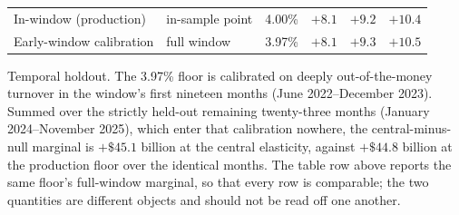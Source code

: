 \documentclass[12pt]{article}
\begin{document}
\begin{table}[!t]
\begin{threeparttable}
\begin{tabular}{llcccc}
\midrule
In-window (production) & in-sample point & 4.00\% & $+8.1$ & $+9.2$ & $+10.4$ \\
Early-window calibration & full window\tnote{a} & 3.97\% & $+8.1$ & $+9.3$ & $+10.5$ \\
\bottomrule
\end{tabular}
\begin{tablenotes}[flushleft]\footnotesize
\item[a] Temporal holdout. The 3.97\% floor is calibrated on deeply out-of-the-money turnover in the window's first nineteen months (June 2022--December 2023). Summed over the strictly held-out remaining twenty-three months (January 2024--November 2025), which enter that calibration nowhere, the central-minus-null marginal is $+\$45.1$ billion at the central elasticity, against $+\$44.8$ billion at the production floor over the identical months. The table row above reports the same floor's full-window marginal, so that every row is comparable; the two quantities are different objects and should not be read off one another.
\end{tablenotes}
\end{threeparttable}
\end{table}
\end{document}
